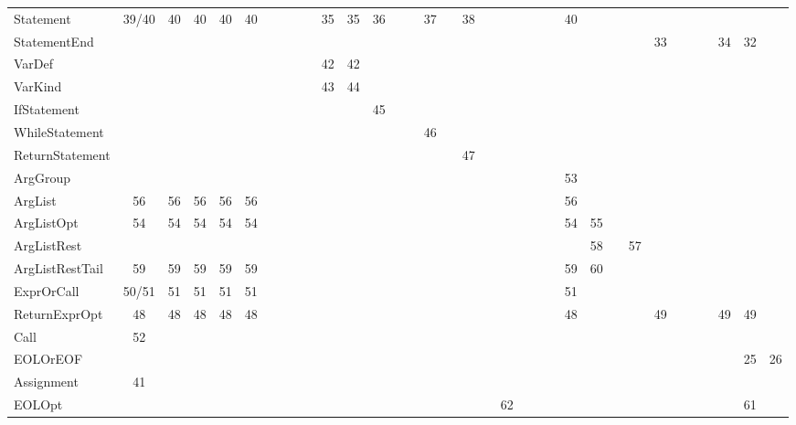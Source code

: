 \documentclass[a4paper, 11pt]{article}
\begin{document}
\begin{center}
\begin{adjustbox}{
        angle=-90,
        width=\textwidth,
        max totalheight=0.86\textheight,
        center
    }
\begin{tabular}{l *{33}{c}}
                Statement & 39/40 & 40 & 40 & 40 & 40 & & & & & 35 & 35 & 36 & & & 37 & & 38 & & & & & & 40 & & & & & & & & & & \\
                StatementEnd & & & & & & & & & & & & & & & & & & & & & & & & & & & 33 & & & & 34 & 32 & \\
                VarDef & & & & & & & & & & 42 & 42 & & & & & & & & & & & & & & & & & & & & & & \\
                VarKind & & & & & & & & & & 43 & 44 & & & & & & & & & & & & & & & & & & & & & & \\
                IfStatement & & & & & & & & & & & & 45 & & & & & & & & & & & & & & & & & & & & & \\
                WhileStatement & & & & & & & & & & & & & & & 46 & & & & & & & & & & & & & & & & & & \\
                ReturnStatement & & & & & & & & & & & & & & & & & 47 & & & & & & & & & & & & & & & & \\
                ArgGroup & & & & & & & & & & & & & & & & & & & & & & & 53 & & & & & & & & & & \\
                ArgList & 56 & 56 & 56 & 56 & 56 & & & & & & & & & & & & & & & & & & 56 & & & & & & & & & & \\
                ArgListOpt & 54 & 54 & 54 & 54 & 54 & & & & & & & & & & & & & & & & & & 54 & 55 & & & & & & & & & \\
                ArgListRest & & & & & & & & & & & & & & & & & & & & & & & & 58 & & 57 & & & & & & & \\
                ArgListRestTail & 59 & 59 & 59 & 59 & 59 & & & & & & & & & & & & & & & & & & 59 & 60 & & & & & & & & & \\
                ExprOrCall & 50/51 & 51 & 51 & 51 & 51 & & & & & & & & & & & & & & & & & & 51 & & & & & & & & & & \\
                ReturnExprOpt & 48 & 48 & 48 & 48 & 48 & & & & & & & & & & & & & & & & & & 48 & & & & 49 & & & & 49 & 49 & \\
                Call & 52 & & & & & & & & & & & & & & & & & & & & & & & & & & & & & & & & \\
                EOLOrEOF & & & & & & & & & & & & & & & & & & & & & & & & & & & & & & & & 25 & 26 \\
                Assignment & 41 & & & & & & & & & & & & & & & & & & & & & & & & & & & & & & & & \\
                EOLOpt & & & & & & & & & & & & & & & & & & & 62 & & & & & & & & & & & & & 61 & \\
                
            \bottomrule
        \end{tabular}

    \end{adjustbox}

    \label{tab:ll}
\end{center}
\end{document}
